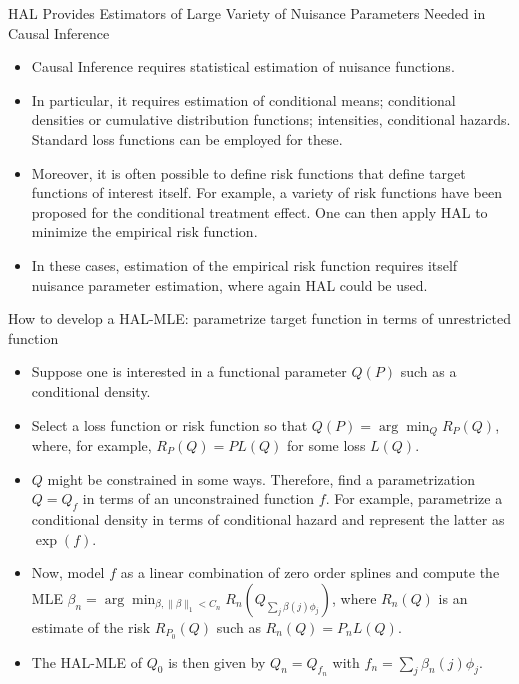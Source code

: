 \documentclass[t]{beamer}
\begin{document}
\begin{frame}{HAL Provides Estimators of Large Variety of Nuisance Parameters Needed in Causal Inference}
\begin{itemize}
\item Causal Inference requires statistical estimation of nuisance functions.
\item In particular, it requires  estimation of conditional means; conditional  densities or cumulative distribution functions; intensities, conditional hazards. Standard loss functions can be employed for these.
\item Moreover, it is often possible to define risk functions that define  target functions of interest itself. For example, a variety of risk functions have been proposed for the conditional treatment effect. One can then apply HAL to minimize the empirical risk function.
\item In these cases,  estimation of the empirical risk function requires itself nuisance parameter estimation, where again HAL could be used.
\end{itemize}
\end{frame}

\begin{frame}{How to develop a HAL-MLE: parametrize target function in terms of unrestricted function}
\begin{itemize}
\item Suppose one is interested in a functional parameter $Q(P)$  such as a conditional density.
\item Select a loss function or risk function so that $Q(P)=\arg\min_Q R_P(Q)$, where, for example, $R_P(Q)=PL(Q)$ for some loss $L(Q)$.
\item $Q$ might be constrained in some ways. Therefore, find a parametrization $Q=Q_f$ in terms of an unconstrained function $f$. For example, parametrize a conditional density in terms of conditional hazard and represent the latter as $\exp(f)$.
\item Now, model $f$ as a linear combination of zero order splines and compute the MLE
$\beta_n=\arg\min_{\beta,\lVert\beta\rVert_1<C_n}R_n\left (Q_{\sum_j \beta(j)\phi_j}\right)$,
where $R_n(Q)$ is an estimate of the risk $R_{P_0}(Q)$ such as $R_n(Q)=P_n L(Q)$.
\item The HAL-MLE of $Q_0$ is then given by $Q_n=Q_{f_n}$ with $f_n=\sum_j\beta_n(j)\phi_j$.
\end{itemize}
\end{frame}
\end{document}
